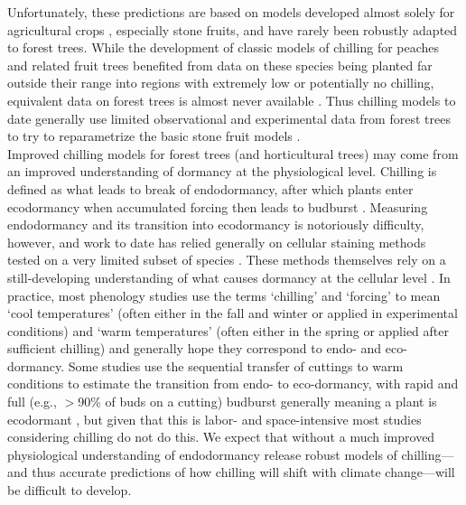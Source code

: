 \documentclass[11pt,letter]{article}
\begin{document}
Unfortunately, these predictions are based on models developed almost solely for agricultural crops \citep[but see][]{harrington2015}, especially stone fruits, and have rarely been robustly adapted to forest trees. While the development of classic models of chilling for peaches and related fruit trees benefited from data on these species being planted far outside their range into regions with extremely low or potentially no chilling, equivalent data on forest trees is almost never available \citep{dennis2003}. Thus chilling models to date generally use limited observational and experimental data from forest trees to try to reparametrize the basic stone fruit models \citep{Chuine2000}.\\

Improved chilling models for forest trees (and horticultural trees) may come from an improved understanding of dormancy at the physiological level. Chilling is defined as what leads to break of endodormancy, after which plants enter ecodormancy when accumulated forcing then leads to budburst \citep{chuine2016}. Measuring endodormancy and its transition into ecodormancy is notoriously difficulty, however, and work to date has relied generally on cellular staining methods tested on a very limited subset of species \citep{rinne2011}. These methods themselves rely on a still-developing understanding of what causes dormancy at the cellular level \citep{vanderschoot2014}. In practice, most phenology studies use the terms `chilling' and `forcing' to mean `cool temperatures' (often either in the fall and winter or applied in experimental conditions) and `warm temperatures' (often either in the spring or applied after sufficient chilling) and generally hope they correspond to endo- and eco-dormancy. Some studies use the sequential transfer of cuttings to warm conditions to estimate the transition from endo- to eco-dormancy, with rapid and full (e.g., $>$90\% of buds on a cutting) budburst generally meaning a plant is ecodormant \citep[e.g.,][]{Junttila:2012aa}, but given that this is labor- and space-intensive most studies considering chilling do not do this. We expect that without a much improved physiological understanding of endodormancy release robust models of chilling---and thus accurate predictions of how chilling will shift with climate change---will be difficult to develop. \\ %
\end{document}
